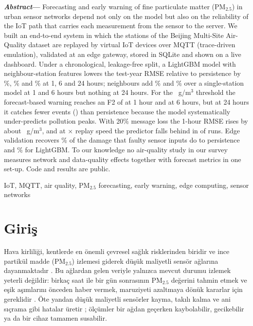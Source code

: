 \documentclass[conference]{IEEEtran}
\newcommand{\pmtwo}{PM$_{2.5}$}
\begin{document}
\vspace{3pt}
\noindent\textbf{\textit{Abstract}---}%
%
Forecasting and early warning of fine particulate matter (\pmtwo{}) in urban sensor networks depend not only on the model but also on the reliability of the IoT path that carries each measurement from the sensor to the server. We built an end-to-end system in which the \nDataStations{} stations of the Beijing Multi-Site Air-Quality dataset are replayed by \nDataStations{} virtual IoT devices over MQTT (trace-driven emulation), validated at an edge gateway, stored in SQLite and shown on a live dashboard. Under a chronological, leakage-free split, a LightGBM model with neighbour-station features lowers the test-year RMSE relative to persistence by \nImprMtwobHOne{}\%, \nImprMtwobHSix{}\% and \nImprMtwobHTwentyFour{}\% at 1, 6 and 24 hours; neighbours add \nAblKelevenHOne{}\% and \nAblKelevenHSix{}\% over a single-station model at 1 and 6 hours but nothing at 24 hours. For the \nThetaHigh{}~\textmu g/m$^3$ threshold the forecast-based warning reaches an F2 of \nWarnFtwoMtwobHOne{} at 1 hour and \nWarnFtwoMtwobHSix{} at 6 hours, but at 24 hours it catches fewer events (\nWarnEvRecMtwobHTwentyFour{}) than persistence because the model systematically under-predicts pollution peaks. With 20\% message loss the 1-hour RMSE rises by about \nDmgTwenty{}~\textmu g/m$^3$, and at \nSpeedSlow{}$\times$ replay speed the predictor falls behind in \nBehindTwenty{} of \nRunsTwenty{} runs. Edge validation recovers \nRobRecPersistHOne{}\% of the damage that faulty sensor inputs do to persistence and \nRobRecMtwobHOne{}\% for LightGBM. To our knowledge no air-quality study in our survey measures network and data-quality effects together with forecast metrics in one set-up. Code and results are public.

\begin{IEEEkeywords}
%
IoT, MQTT, air quality, \pmtwo{} forecasting, early warning, edge computing, sensor networks%
\end{IEEEkeywords}

\section{Giriş}
Hava kirliliği, kentlerde en önemli çevresel sağlık risklerinden biridir ve ince partikül madde (\pmtwo{}) izlemesi giderek düşük maliyetli sensör ağlarına dayanmaktadır \cite{R4,R1,R2}. Bu ağlardan gelen veriyle yalnızca mevcut durumu izlemek yeterli değildir: birkaç saat ile bir gün sonrasının \pmtwo{} değerini tahmin etmek ve eşik aşımlarını önceden haber vermek, maruziyeti azaltmaya dönük kararlar için gereklidir \cite{R3}. Öte yandan düşük maliyetli sensörler kayma, takılı kalma ve ani sıçrama gibi hatalar üretir \cite{R1,R20,R22,R21}; ölçümler bir ağdan geçerken kaybolabilir, gecikebilir ya da bir cihaz tamamen susabilir.
\end{document}
